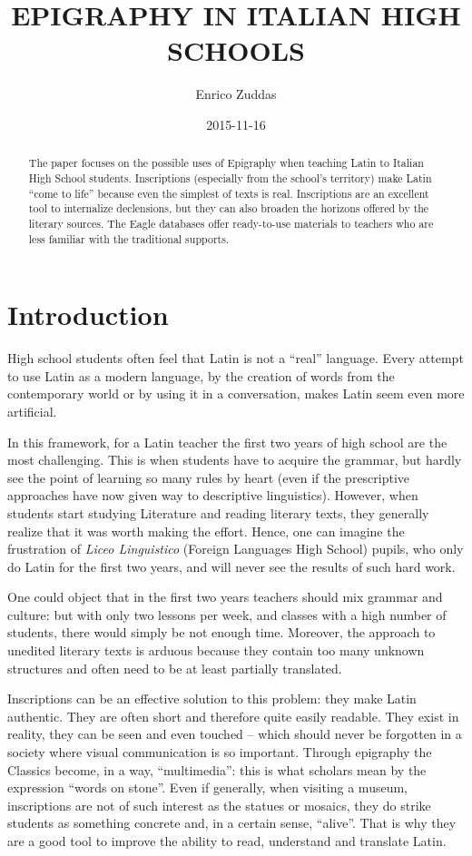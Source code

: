 \documentclass[amsthm,ebook]{saparticle}
\title{EPIGRAPHY IN ITALIAN HIGH SCHOOLS}
\author[up]{Enrico Zuddas\corref{first}}
\date{2015-11-16}
\begin{document}
\maketitle
\begin{abstract}
The paper focuses on the possible uses of Epigraphy when teaching Latin to Italian High School students. Inscriptions
(especially from the school’s territory) make Latin ``come to life'' because even the simplest of texts is real.
Inscriptions are an excellent tool to internalize declensions, but they can also broaden the horizons offered by the
literary sources. The Eagle databases offer ready-to-use materials to teachers who are less familiar with the
traditional supports.
\end{abstract}




\section{Introduction}
\noindent High school students often feel that Latin is not a ``real'' language. Every attempt to use Latin as a modern language, by
the creation of words from the contemporary world or by using it in a conversation, makes Latin seem even more
artificial.

In this framework, for a Latin teacher the first two years of high school are the most challenging. This is when
students have to acquire the grammar, but hardly see the point of learning so many rules by heart (even if the
prescriptive approaches have now given way to descriptive linguistics). However, when students start studying
Literature and reading literary texts, they generally realize that it was worth making the effort. Hence, one can
imagine the frustration of \emph{Liceo Linguistico} (Foreign Languages High School) pupils, who only do Latin for the first
two years, and will never see the results of such hard work.

One could object that in the first two years teachers should mix grammar and culture: but with only two lessons per
week, and classes with a high number of students, there would simply be not enough time. Moreover, the approach to
unedited literary texts is arduous because they contain too many unknown structures and often need to be at least
partially translated.

Inscriptions can be an effective solution to this problem: they make Latin authentic. They are often short and therefore
quite easily readable. They exist in reality, they can be seen and even touched – which should never be forgotten in a
society where visual communication is so important. Through epigraphy the Classics become, in a way, ``multimedia'': this
is what scholars mean by the expression ``words on stone''. Even if generally, when visiting a museum, inscriptions are
not of such interest as the statues or mosaics, they do strike students as something concrete and, in a certain sense,
``alive''. That is why they are a good tool to improve the ability to read, understand and translate Latin.
\end{document}
